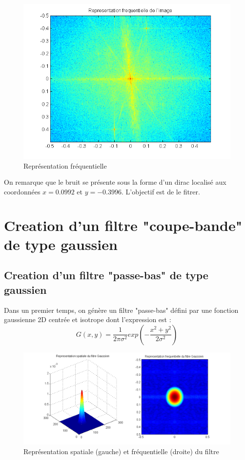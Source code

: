 \documentclass[11pt]{article}
\begin{document}
		\begin{figure}[h]
			\centering
			\includegraphics[scale=0.8]{img/img2.png}
			\caption{Représentation fréquentielle}
			\label{img2}
		\end{figure}
		
		On remarque que le bruit se présente sous la forme d'un dirac localisé aux coordonnées $x=0.0992$ et $y=-0.3996$. L'objectif est de le fitrer.

\section{Creation d'un filtre "coupe-bande" de type gaussien}

	\subsection{Creation d'un filtre "passe-bas" de type gaussien}
	
	Dans un premier temps, on génère un filtre "passe-bas" défini par une fonction gaussienne 2D centrée et isotrope dont l'expression est :
	\[ G(x,y) = \frac{1}{2\pi\sigma^2}exp({-\frac{x^2+y^2}{2\sigma^2}}) \]

		\begin{figure}[h]
			\centering
			\includegraphics[scale=0.65]{img/img3.png}
			\caption{Représentation spatiale (gauche) et fréquentielle (droite) du filtre}
			\label{img3}
		\end{figure}
\end{document}

